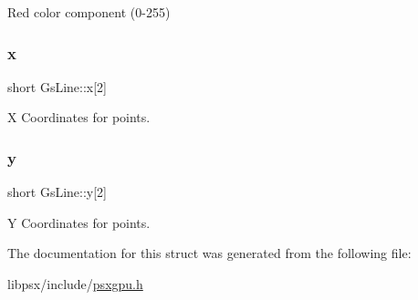 Red color component (0-\/255) 

\mbox{\label{structGsLine_a9f199bc7586a8693bc1fe960aa019ba3}} 
\subsubsection{\texorpdfstring{x}{x}}
{\footnotesize\ttfamily short Gs\+Line\+::x\mbox{[}2\mbox{]}}



X Coordinates for points. 

\mbox{\label{structGsLine_ad9a2ccbd59395269d1a193f68e56d89e}} 
\subsubsection{\texorpdfstring{y}{y}}
{\footnotesize\ttfamily short Gs\+Line\+::y\mbox{[}2\mbox{]}}



Y Coordinates for points. 



The documentation for this struct was generated from the following file\+:\begin{DoxyCompactItemize}
\item 
libpsx/include/\hyperlink{psxgpu_8h}{psxgpu.\+h}\end{DoxyCompactItemize}

